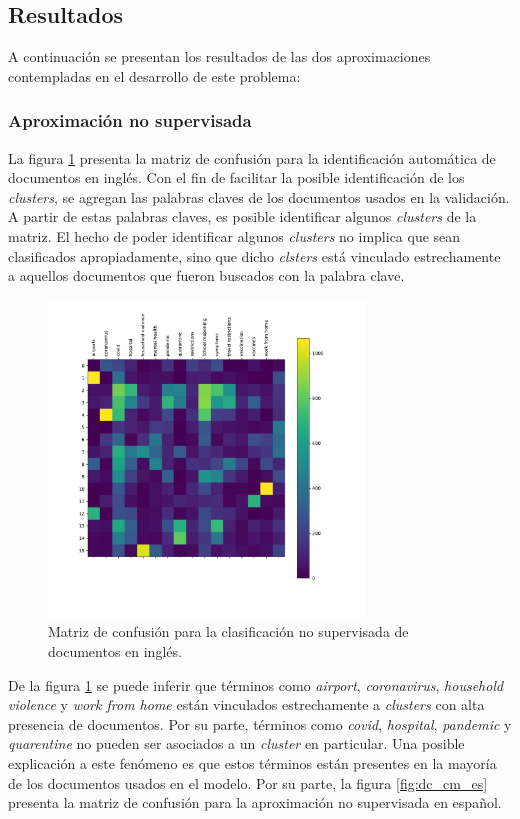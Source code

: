 \subsection{Resultados}
A continuación se presentan los resultados de las dos aproximaciones contempladas en el desarrollo de este problema:

\subsubsection{Aproximación no supervisada}
La figura \ref{fig:dc_cm_en} presenta la matriz de confusión para la identificación automática de documentos en inglés. Con el fin de facilitar la posible identificación de los \textit{clusters}, se agregan las palabras claves de los documentos usados en la validación. A partir de estas palabras claves, es posible identificar algunos \textit{clusters} de la matriz. El hecho de poder identificar algunos \textit{clusters} no implica que sean clasificados apropiadamente, sino que dicho \textit{clsters} está vinculado estrechamente a aquellos documentos que fueron buscados con la palabra clave. \\

\begin{figure}[H]
    \centering
    \includegraphics[width=0.75\textwidth]{results/AutomaticIdentification/cf_en.pdf}
    \caption{Matriz de confusión para la clasificación no supervisada de documentos en inglés.}
    \label{fig:dc_cm_en}
\end{figure}

De la figura \ref{fig:dc_cm_en} se puede inferir que términos como \textit{airport}, \textit{coronavirus}, \textit{household violence} y \textit{work from home} están vinculados estrechamente a \textit{clusters} con alta presencia de documentos. Por su parte, términos como \textit{covid}, \textit{hospital}, \textit{pandemic} y \textit{quarentine} no pueden ser asociados a un \textit{cluster} en particular. Una posible explicación a este fenómeno es que estos términos están presentes en la mayoría de los documentos usados en el modelo. Por su parte, la figura \ref{fig:dc_cm_es} presenta la matriz de confusión para la aproximación no supervisada en español. \\

